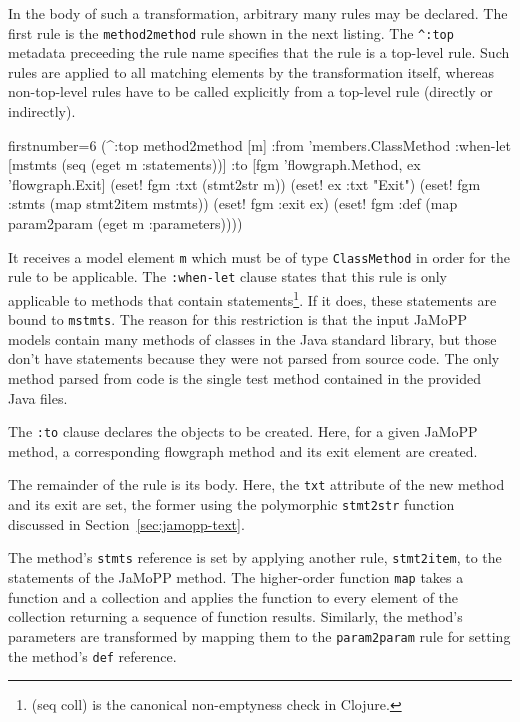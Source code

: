 \documentclass[11pt]{article}
\begin{document}
In the body of such a transformation, arbitrary many rules may be declared.
The first rule is the \verb|method2method| rule shown in the next listing.  The
\verb|^:top| metadata preceeding the rule name specifies that the rule is a
top-level rule.  Such rules are applied to all matching elements by the
transformation itself, whereas non-top-level rules have to be called explicitly
from a top-level rule (directly or indirectly).

\begin{clojurecode*}{firstnumber=6}
  (^:top method2method [m]
      :from 'members.ClassMethod
      :when-let [mstmts (seq (eget m :statements))]
      :to [fgm 'flowgraph.Method, ex 'flowgraph.Exit]
      (eset! fgm :txt (stmt2str m))
      (eset! ex :txt "Exit")
      (eset! fgm :stmts (map stmt2item mstmts))
      (eset! fgm :exit ex)
      (eset! fgm :def (map param2param (eget m :parameters))))
\end{clojurecode*}

It receives a model element \verb|m| which must be of type \verb|ClassMethod|
in order for the rule to be applicable.  The \verb|:when-let| clause states
that this rule is only applicable to methods that contain
statements\footnote{\textsf{(seq coll)} is the canonical non-emptyness check in
  Clojure.}.  If it does, these statements are bound to \verb|mstmts|.  The
reason for this restriction is that the input JaMoPP models contain many
methods of classes in the Java standard library, but those don't have
statements because they were not parsed from source code.  The only method
parsed from code is the single test method contained in the provided Java
files.

The \verb|:to| clause declares the objects to be created.  Here, for a given
JaMoPP method, a corresponding flowgraph method and its exit element are
created.

The remainder of the rule is its body.  Here, the \verb|txt| attribute of the
new method and its exit are set, the former using the polymorphic
\verb|stmt2str| function discussed in Section~\ref{sec:jamopp-text}.

The method's \verb|stmts| reference is set by applying another rule,
\verb|stmt2item|, to the statements of the JaMoPP method.  The higher-order
function \verb|map| takes a function and a collection and applies the function
to every element of the collection returning a sequence of function results.
Similarly, the method's parameters are transformed by mapping them to the
\verb|param2param| rule for setting the method's \verb|def| reference.
\end{document}
